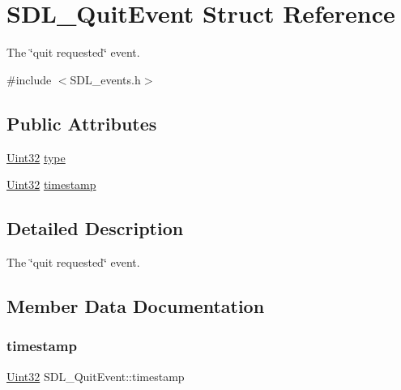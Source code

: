 \hypertarget{struct_s_d_l___quit_event}{}\section{S\+D\+L\+\_\+\+Quit\+Event Struct Reference}
\label{struct_s_d_l___quit_event}


The \char`\"{}quit requested\char`\"{} event.  




{\ttfamily \#include $<$S\+D\+L\+\_\+events.\+h$>$}

\subsection*{Public Attributes}
\begin{DoxyCompactItemize}
\item 
\hyperlink{_s_d_l__stdinc_8h_add440eff171ea5f55cb00c4a9ab8672d}{Uint32} \hyperlink{struct_s_d_l___quit_event_a51ab0279e6de40249ba93971a8757cf0}{type}
\item 
\hyperlink{_s_d_l__stdinc_8h_add440eff171ea5f55cb00c4a9ab8672d}{Uint32} \hyperlink{struct_s_d_l___quit_event_a7acd4fa42ca96da8edac146baaa0b433}{timestamp}
\end{DoxyCompactItemize}


\subsection{Detailed Description}
The \char`\"{}quit requested\char`\"{} event. 

\subsection{Member Data Documentation}
\mbox{\label{struct_s_d_l___quit_event_a7acd4fa42ca96da8edac146baaa0b433}} 
\subsubsection{\texorpdfstring{timestamp}{timestamp}}
{\footnotesize\ttfamily \hyperlink{_s_d_l__stdinc_8h_add440eff171ea5f55cb00c4a9ab8672d}{Uint32} S\+D\+L\+\_\+\+Quit\+Event\+::timestamp}

\mbox{\label{struct_s_d_l___quit_event_a51ab0279e6de40249ba93971a8757cf0}} 
